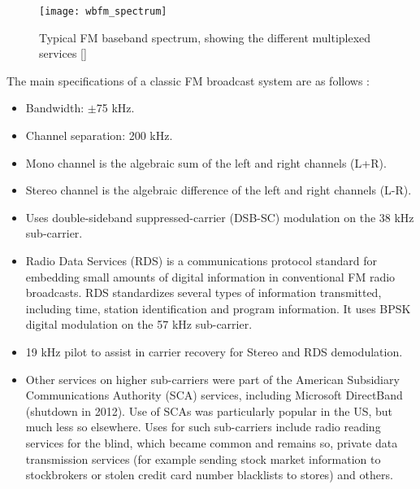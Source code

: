\begin{figure}[H]
  \centering
  \texttt{[image: wbfm\_spectrum]}
  \caption{Typical FM baseband spectrum, showing the different multiplexed services [\citeauthor{image:fm_spectrum}]}
  \label{fig:wbfm_spectrum}
\end{figure}

The main specifications of a classic FM broadcast system are as follows \cite{fm_demod2}:
\begin{itemize}
  \item Bandwidth: $\pm$75 kHz.
  \item Channel separation: 200 kHz.
  \item Mono channel is the algebraic sum of the left and right channels (L+R).
  \item Stereo channel is the algebraic difference of the left and right channels (L-R).
  \item Uses double-sideband suppressed-carrier (DSB-SC) modulation on the 38 kHz sub-carrier.
  \item Radio Data Services (RDS) is a communications protocol standard for embedding small amounts of digital information in conventional FM radio broadcasts. RDS standardizes several types of information transmitted, including time, station identification and program information. It uses BPSK digital modulation on the 57 kHz sub-carrier.
  \item 19 kHz pilot to assist in carrier recovery for Stereo and RDS demodulation.
  \item Other services on higher sub-carriers were part of the American Subsidiary Communications Authority (SCA) services, including Microsoft DirectBand (shutdown in 2012). Use of SCAs was particularly popular in the US, but much less so elsewhere. Uses for such sub-carriers include radio reading services for the blind, which became common and remains so, private data transmission services (for example sending stock market information to stockbrokers or stolen credit card number blacklists to stores) and others.
\end{itemize}

